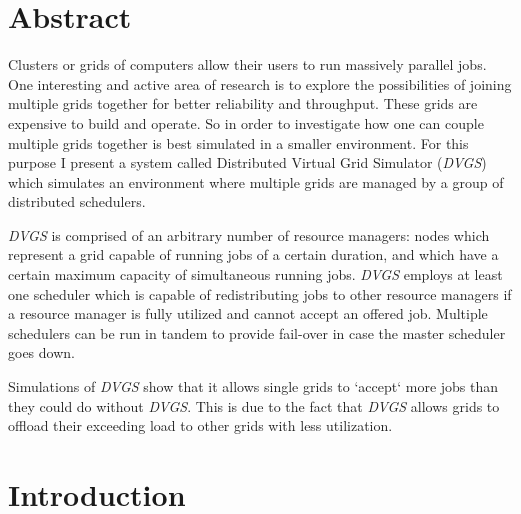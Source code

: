 \documentclass{article}
\begin{document}
\maketitle
\date{}

\section{Abstract}

Clusters or grids of computers allow their users to run massively parallel jobs. One interesting and active area of research is to explore the possibilities of joining multiple grids together for better reliability and throughput. These grids are expensive to build and operate. So in order to investigate how one can couple multiple grids together is best simulated in a smaller environment. For this purpose I present a system called Distributed Virtual Grid Simulator (\textit{DVGS}) which simulates an environment where multiple grids are managed by a group of distributed schedulers.

\textit{DVGS} is comprised of an arbitrary number of resource managers: nodes which represent a grid capable of running jobs of a certain duration, and which have a certain maximum capacity of simultaneous running jobs. \textit{DVGS} employs at least one scheduler which is capable of redistributing jobs to other resource managers if a resource manager is fully utilized and cannot accept an offered job. Multiple schedulers can be run in tandem to provide fail-over in case the master scheduler goes down.

Simulations of \textit{DVGS} show that it allows single grids to `accept` more jobs than they could do without \textit{DVGS}. This is due to the fact that \textit{DVGS} allows grids to offload their exceeding load to other grids with less utilization.



\section{Introduction}
\end{document}
